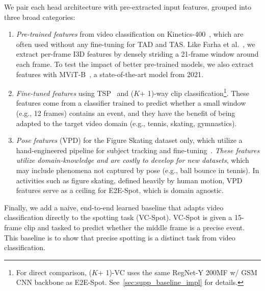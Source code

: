 \documentclass[runningheads]{llncs}
\newcommand{\notation}[1]{\ensuremath{#1}\xspace}
\newcommand{\OURMETHOD}{{E2E-Spot}\xspace}
\newcommand{\NumClasses}{\notation{K}}
\begin{document}
We pair each head architecture with pre-extracted input features, grouped into three broad categories:
\begin{enumerate}
	\item {\em Pre-trained features} from video classification on Kinetics-400~\cite{kinetics}, which are often used without any fine-tuning for TAD and TAS.
Like Farha et al.~\cite{mstcn}, we extract per-frame I3D features by densely striding a 21-frame window around each frame.
To test the impact of better pre-trained models, we also extract features with MViT-B~\cite{mvit}, a state-of-the-art model from 2021.
\item {\em Fine-tuned features} using TSP~\cite{tsp} and (\NumClasses + 1)-way clip classification\footnote{For direct comparison, (\NumClasses + 1)-VC uses the same RegNet-Y 200MF w/ GSM CNN backbone as \OURMETHOD. See~\autoref{sec:supp_baseline_impl} for details.}.
These features come from a classifier trained to predict whether a small window (e.g., 12 frames) contains an event, and they have the benefit of being adapted to the target video domain (e.g., tennis, skating, gymnastics).
\item {\em Pose features} (VPD) for the Figure Skating dataset only, which utilize a hand-engineered pipeline for subject tracking and fine-tuning~\cite{vpd}.
\emph{These features utilize domain-knowledge and are costly to develop for new datasets}, which may include phenomena not captured by pose (e.g., ball bounce in tennis).
In activities such as figure skating, defined heavily by human motion, VPD features serve as a ceiling for \OURMETHOD, which is domain agnostic.
\end{enumerate}

Finally, we add a naive, end-to-end learned baseline that adapts video classification directly to the spotting task (VC-Spot).
VC-Spot is given a 15-frame clip and tasked to predict whether the middle frame is a precise event.
This baseline is to show that precise spotting is a distinct task from video classification.
\end{document}
